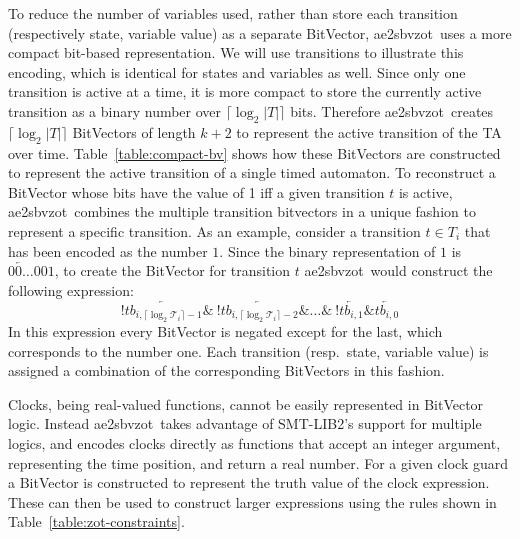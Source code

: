 \documentclass[a4paper,11pt]{report}
\newcommand*\BitAnd{\mathbin{\&}}
\newcommand{\BitNeg}{!}
\theoremstyle{definition}
\newcommand{\aez}{ae2sbvzot}
\begin{document}
To reduce the number of variables used, rather than store each transition
(respectively state, variable value) as a separate BitVector, \aez\ uses a more
compact bit-based representation. We will use transitions to illustrate this
encoding, which is identical for states and variables as well. Since only one
transition is active at a time, it is more compact to store the currently active
transition as a binary number over \(\lceil\log_2 |T|\rceil\) bits.
Therefore \aez\ creates \(\lceil\log_2 |T|\rceil\) BitVectors of
length \(k+2\) to represent the active transition of the TA over time.
Table~\ref{table:compact-bv} shows how these BitVectors are constructed to represent
the active transition of a single timed automaton. To reconstruct a BitVector
whose bits have the value of 1 iff a given transition $t$ is active, \aez\
combines the multiple transition bitvectors in a unique fashion to represent a
specific transition. As an example, consider a transition $t \in T_{i}$ that has
been encoded as the number $1$. Since the binary representation of $1$ is
$\overleftarrow{00\ldots}001$, to create the BitVector for transition $t$ \aez\
would construct the following expression:
\[\BitNeg\overleftarrow{tb_{i,\lceil \log_2 \mathcal{T}_i \rceil -1}} \BitAnd \ \BitNeg\overleftarrow{tb_{i,\lceil \log_2 \mathcal{T}_i \rceil -2}} \BitAnd \ldots \BitAnd \ \BitNeg\overleftarrow{tb_{i,1}} \BitAnd \overleftarrow{tb_{i,0}} \]
In this expression every BitVector is negated except for the last, which
corresponds to the number one. Each transition (resp.\ state, variable value) is
assigned a combination of the corresponding BitVectors in this fashion.


Clocks, being real-valued functions, cannot be easily represented in BitVector
logic. Instead \aez\ takes advantage of SMT-LIB2's support for multiple logics,
and encodes clocks directly as functions that accept an integer argument,
representing the time position, and return a real number. For a given clock
guard a BitVector is constructed to represent the truth value of the clock
expression. These can then be used to construct larger expressions using the
rules shown in Table~\ref{table:zot-constraints}.
\end{document}
